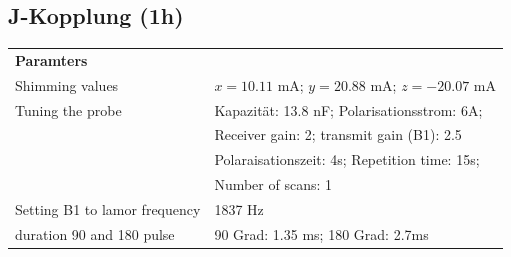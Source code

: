 \subsection{J-Kopplung (1h)}


    \begin{tabular}{ll}

        {\bf Paramters} &            \\
        
        Shimming values & $x = 10.11$ mA; $y = 20.88$ mA; $z = −20.07$ mA \\
        
        Tuning the probe & Kapazität: 13.8 nF; Polarisationsstrom: 6A;\\
        & Receiver gain: 2; transmit gain (B1): 2.5\\
        & Polaraisationszeit: 4s; Repetition time: 15s; \\
        & Number of scans: 1\\
        
        Setting B1 to lamor frequency &    1837 Hz \\
        
        duration 90 and 180 pulse & 90 Grad: 1.35 ms; 180 Grad: 2.7ms \\
    \end{tabular} 

    \vspace{1cm}

